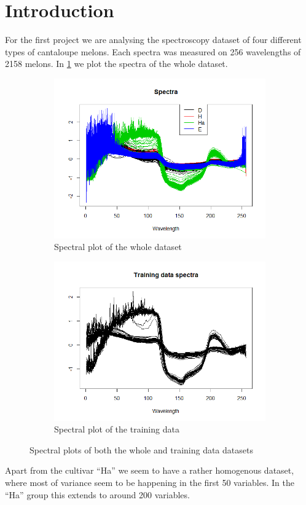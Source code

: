 \documentclass[12pt]{article}
\begin{document}
\section{Introduction}
For the first project we are analysing the spectroscopy dataset of four different types of cantaloupe melons. Each spectra was measured on 256 wavelengths of 2158 melons.
In \ref{fig:spectra} we plot the spectra of the whole dataset.
\begin{figure}[h!]
    \begin{subfigure}[b]{0.5\linewidth}
        \centering
        \includegraphics[width=\textwidth]{../images/project1/spectra.png}
     \caption{Spectral plot of the whole dataset}\label{fig:spectra}
    \end{subfigure}%
    \begin{subfigure}[b]{0.5\linewidth}
        \centering
     \includegraphics[width=\textwidth]{../images/project1/trainDataSpectra.png}
     \caption{Spectral plot of the training data}\label{fig:trainDataSpectra}
    \end{subfigure}%
   \caption{Spectral plots of both the whole and training data datasets}
\end{figure}
Apart from the cultivar ``Ha'' we seem to have a rather homogenous dataset, where most of variance seem to be happening in the first 50 variables. In the ``Ha'' group this 
extends to around 200 variables.
\end{document}
